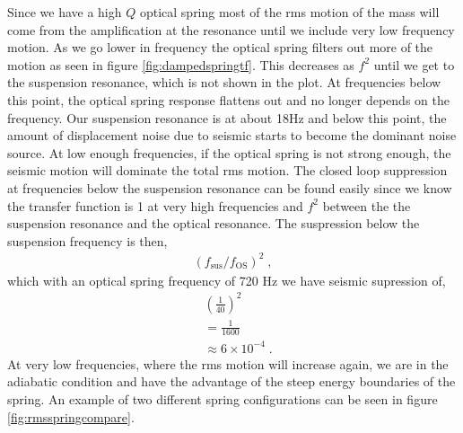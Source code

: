 Since we have a high $Q$ optical spring most of the \ac{rms} motion of the mass
will come from the amplification at the resonance until we include very low
frequency motion.
As we go lower in frequency the optical spring filters out more of the motion
as seen in figure \ref{fig:dampedspringtf}.
This decreases as $f^2$ until we get to the suspension resonance, which is not
shown in the plot.
At frequencies below this point, the optical spring response flattens out
and no longer depends on the frequency.
Our suspension resonance is at about 18Hz and below this point, the amount
of displacement noise due to seismic starts to become the dominant noise
source.
At low enough frequencies, if the optical spring is not strong enough, the
seismic motion will dominate the total \ac{rms} motion.
The closed loop suppression at frequencies below the suspension resonance can
be found easily since we know the transfer function is 1 at very high
frequencies and $f^2$ between the the suspension resonance and the optical
resonance.
The suspression below the suspension frequency is then,
\begin{align}
\left( f_\mathrm{sus}/f_\mathrm{OS} \right)^2 \;,
\end{align}
which with an optical spring frequency of 720 Hz we have seismic supression of,
\begin{align*}
& \left(\frac{1}{40}\right)^2 \\
&= \frac{1}{1600} \\
&\approx 6\times 10^{-4} \;.
\end{align*}
At very low frequencies, where the \ac{rms} motion will increase again, we are
in the adiabatic condition and have the advantage of the steep energy
boundaries of the spring. An example of two different spring configurations can
be seen in figure \ref{fig:rmsspringcompare}.

